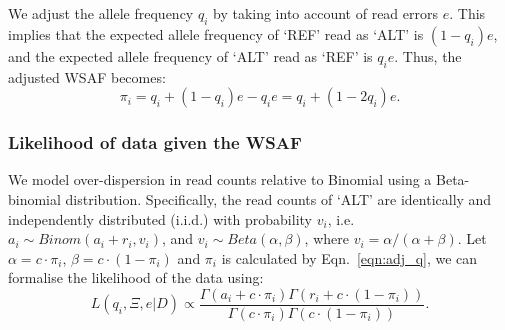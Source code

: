 \documentclass{bioinfo}
\begin{document}
We adjust the allele frequency $q_i$ by taking into account of read errors $e$. This implies that the expected allele frequency of `REF' read as `ALT' is $(1 - q_i)e$, and the expected allele frequency of `ALT' read as `REF' is $q_ie$. Thus, the adjusted WSAF becomes:
\begin{equation}
\pi_i = q_i + (1 - q_i)e - q_ie = q_i + (1 - 2q_i)e.\label{eqn:adj_q}
\end{equation}

\subsubsection{Likelihood of data given the WSAF}
We model over-dispersion in read counts relative to Binomial using a Beta-binomial distribution. Specifically, the read counts of `ALT' are identically and independently distributed (i.i.d.) with probability $v_i$, i.e. $a_i \sim Binom(a_i + r_i, v_i)$, and $v_i \sim Beta(\alpha, \beta)$, where $v_i = \alpha/(\alpha+\beta)$. Let $\alpha = c\cdot \pi_{i} $, $\beta = c\cdot (1-\pi_{i})$ and $\pi_i$ is calculated by Eqn.~\eqref{eqn:adj_q}, we can formalise the likelihood of the data using: %
\begin{equation}
L(q_{i}, \Xi, e | D) \propto \frac{\Gamma(a_i + c\cdot \pi_{i}) \Gamma(r_i + c\cdot (1-\pi_{i}))}{\Gamma(c\cdot \pi_{i})\Gamma(c\cdot (1-\pi_{i}))}. \label{eqn:llk}
\end{equation}
\end{document}
